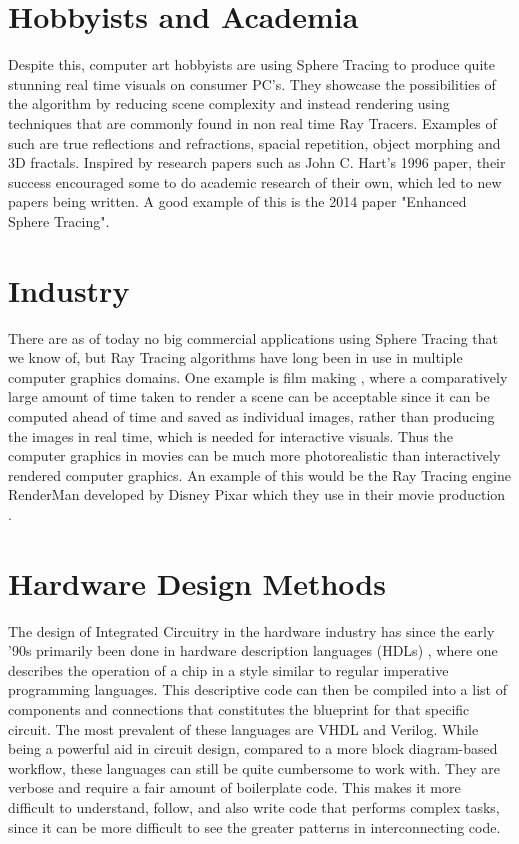 	\section{ Hobbyists and Academia }

		Despite this, computer art hobbyists are using Sphere Tracing to
		produce quite stunning real time visuals on consumer PC's. They
		showcase the possibilities of the algorithm by reducing scene
		complexity and instead rendering using techniques that are commonly
		found in non real time Ray Tracers. Examples of such are true
		reflections and refractions, spacial repetition, object morphing and 3D
		fractals\cite{InigoQuilez}.  Inspired by research papers such as John
		C. Hart's 1996 paper\cite{Hart1996}, their success encouraged some
		to do academic research of their own, which led to new papers being
		written. A good example of this is the 2014 paper "Enhanced Sphere
		Tracing"\cite{Korndorfer2014}.

	\section{ Industry }		

		There are as of today no big commercial applications using Sphere
		Tracing that we know of, but Ray Tracing algorithms have long been in
		use in multiple computer graphics domains. One example is film
		making \cite{Christensen2006}, where a comparatively large amount of
		time taken to render a scene can be acceptable since it can be computed
		ahead of time and saved as individual images, rather than producing
		the images in real time, which is needed for interactive visuals.
		Thus the computer graphics in movies can be much more photorealistic
		than interactively rendered computer graphics. An example of this
		would be the Ray Tracing engine RenderMan developed by Disney Pixar
		which they use in their movie production \cite{Christensen2006}.

	\section{ Hardware Design Methods } 
	
		The design of Integrated Circuitry in the hardware industry has since
		the early '90s primarily been done in hardware description languages
		(HDLs) \cite{Chen2012}, where one describes the operation of a chip in a
		style similar to regular imperative programming languages. This
		descriptive code can then be compiled into a list of components and
		connections that constitutes the blueprint for that specific circuit.
		The most prevalent of these languages are VHDL and 
		Verilog\cite{Chen2012}. While being a powerful aid in circuit design,
		compared to a more block diagram-based workflow\cite{Lauwereins},
		these languages can still be quite cumbersome to work with. They are
		verbose and require a fair amount of boilerplate code. This makes it
		more difficult to understand, follow, and also write code that
		performs complex tasks, since it can be more difficult to see the
		greater patterns in interconnecting code.
		
